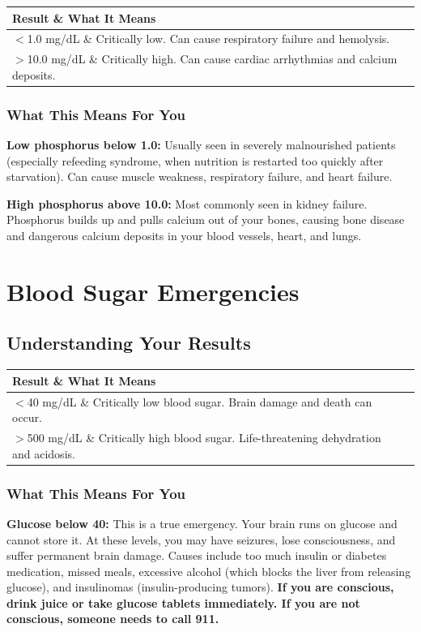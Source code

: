 \begin{longtable}{@{}ll@{}}
\toprule
\textbf{Result} \& \textbf{What It Means} \\
\midrule
$<$1.0 mg/dL \& Critically low. Can cause respiratory failure and hemolysis. \\
$>$10.0 mg/dL \& Critically high. Can cause cardiac arrhythmias and calcium deposits. \\
\bottomrule
\end{longtable}

\subsubsection{What This Means For You}

\textbf{Low phosphorus below 1.0:} Usually seen in severely malnourished patients (especially refeeding syndrome, when nutrition is restarted too quickly after starvation). Can cause muscle weakness, respiratory failure, and heart failure.

\textbf{High phosphorus above 10.0:} Most commonly seen in kidney failure. Phosphorus builds up and pulls calcium out of your bones, causing bone disease and dangerous calcium deposits in your blood vessels, heart, and lungs.

\clearpage
\section{Blood Sugar Emergencies}

\subsection{Understanding Your Results}

\begin{longtable}{@{}ll@{}}
\toprule
\textbf{Result} \& \textbf{What It Means} \\
\midrule
$<$40 mg/dL \& Critically low blood sugar. Brain damage and death can occur. \\
$>$500 mg/dL \& Critically high blood sugar. Life-threatening dehydration and acidosis. \\
\bottomrule
\end{longtable}

\subsubsection{What This Means For You}

\textbf{Glucose below 40:} This is a true emergency. Your brain runs on glucose and cannot store it. At these levels, you may have seizures, lose consciousness, and suffer permanent brain damage. Causes include too much insulin or diabetes medication, missed meals, excessive alcohol (which blocks the liver from releasing glucose), and insulinomas (insulin-producing tumors). \textbf{If you are conscious, drink juice or take glucose tablets immediately. If you are not conscious, someone needs to call 911.}

